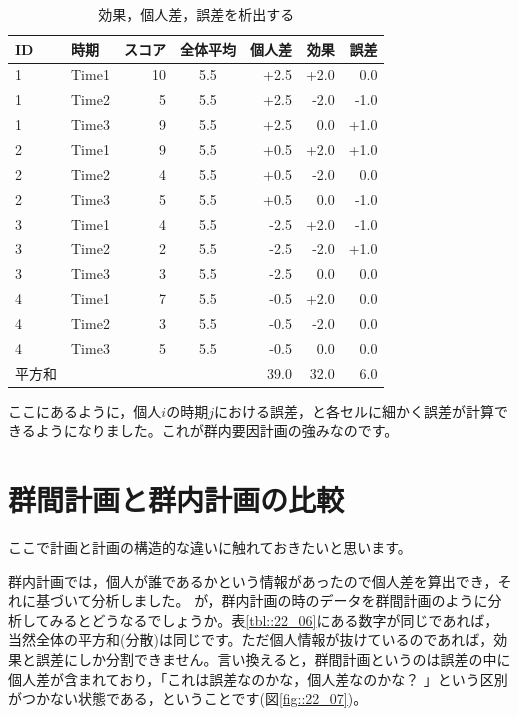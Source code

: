 \documentclass{ltjbook}
\begin{document}
\begin{table}[ht]
	\centering
	\caption{効果，個人差，誤差を析出する}
	\begin{tabular}{llrcrrr}
		\hline
		ID  & 時期    & スコア & 全体平均 & 個人差  & 効果   & 誤差   \\
		\hline
		1   & Time1 & 10  & 5.5  & +2.5 & +2.0 & 0.0  \\
		1   & Time2 & 5   & 5.5  & +2.5 & -2.0 & -1.0 \\
		1   & Time3 & 9   & 5.5  & +2.5 & 0.0  & +1.0 \\
		2   & Time1 & 9   & 5.5  & +0.5 & +2.0 & +1.0 \\
		2   & Time2 & 4   & 5.5  & +0.5 & -2.0 & 0.0  \\
		2   & Time3 & 5   & 5.5  & +0.5 & 0.0  & -1.0 \\
		3   & Time1 & 4   & 5.5  & -2.5 & +2.0 & -1.0 \\
		3   & Time2 & 2   & 5.5  & -2.5 & -2.0 & +1.0 \\
		3   & Time3 & 3   & 5.5  & -2.5 & 0.0  & 0.0  \\
		4   & Time1 & 7   & 5.5  & -0.5 & +2.0 & 0.0  \\
		4   & Time2 & 3   & 5.5  & -0.5 & -2.0 & 0.0  \\
		4   & Time3 & 5   & 5.5  & -0.5 & 0.0  & 0.0  \\
		\hline\hline
		平方和 &       &     &      & 39.0 & 32.0 & 6.0  \\\hline
	\end{tabular}
	\label{tbl::22_07}
\end{table}

ここにあるように，個人$i$の時期$j$における誤差，と各セルに細かく誤差が計算できるようになりました。これが群内要因計画の強みなのです。

\section{群間計画と群内計画の比較}
ここで計画と計画の構造的な違いに触れておきたいと思います。

群内計画では，個人が誰であるかという情報があったので個人差を算出でき，それに基づいて分析しました。
が，群内計画の時のデータを群間計画のように分析してみるとどうなるでしょうか。表\ref{tbl::22_06}にある数字が同じであれば，当然全体の平方和(分散)は同じです。ただ個人情報が抜けているのであれば，効果と誤差にしか分割できません。言い換えると，群間計画というのは誤差の中に個人差が含まれており，「これは誤差なのかな，個人差なのかな？ 」という区別がつかない状態である，ということです(図\ref{fig::22_07})。
\end{document}

